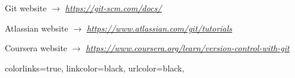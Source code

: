 \documentclass[a4paper,portrait,10pt]{article}   %
\newcommand{\mysecvspace}{\vspace{6mm}}   %
\newcommand{\myurl}[2]{\href{{#1}}{\underline{\textit{#2}}}}   %
\begin{document}

\begin{thebibliography}{99} %

 Git website $\rightarrow$ \myurl{https://git-scm.com/docs/}{https://git-scm.com/docs/}

 Atlassian website $\rightarrow$ \myurl{https://www.atlassian.com/git/tutorials}{https://www.atlassian.com/git/tutorials}

 Coursera website $\rightarrow$ \myurl{https://www.coursera.org/learn/version-control-with-git}{https://www.coursera.org/learn/version-control-with-git}

\end{thebibliography}
\mysecvspace



\hypersetup
{
  colorlinks=true,
  linkcolor=black,   %
  urlcolor=black,   %
}
\pagebreak
\tableofcontents{}
\end{document}
